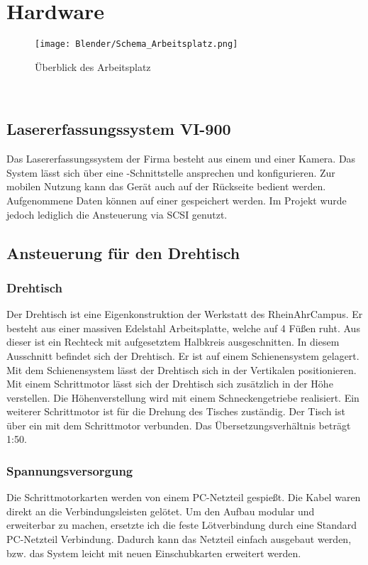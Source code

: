 \chapter{Hardware}
\label{sec:Hardware}
\begin{figure}[htb]
\centering
\texttt{[image: Blender/Schema\_Arbeitsplatz.png]}
\caption{Überblick des Arbeitsplatz}
\label{fig:Übersicht}
\end{figure}

\\

\section{Lasererfassungssystem VI-900}
Das Lasererfassungssystem  der Firma  besteht aus einem  und einer Kamera. Das System lässt sich über eine -Schnittstelle ansprechen und konfigurieren. Zur mobilen Nutzung kann das Gerät auch auf der Rückseite bedient werden. Aufgenommene Daten können auf einer  gespeichert werden. Im Projekt wurde jedoch lediglich die Ansteuerung via SCSI genutzt.

\section{Ansteuerung für den Drehtisch}
\subsection{Drehtisch}
Der Drehtisch ist eine Eigenkonstruktion der Werkstatt des RheinAhrCampus. Er besteht aus einer massiven Edelstahl Arbeitsplatte, welche auf 4 Füßen ruht. Aus dieser ist ein Rechteck mit aufgesetztem Halbkreis ausgeschnitten. In diesem Ausschnitt befindet sich der Drehtisch. Er ist auf einem Schienensystem gelagert. Mit dem Schienensystem lässt der Drehtisch sich in der Vertikalen positionieren. Mit einem Schrittmotor lässt sich der Drehtisch sich zusätzlich in der Höhe verstellen. Die Höhenverstellung wird mit einem Schneckengetriebe realisiert. Ein weiterer Schrittmotor ist für die Drehung des Tisches zuständig. Der Tisch ist über ein  mit dem Schrittmotor verbunden. Das Übersetzungsverhältnis beträgt 1:50.   
\subsection{Spannungsversorgung}
Die Schrittmotorkarten werden von einem PC-Netzteil gespießt. Die Kabel waren direkt an die Verbindungsleisten gelötet. Um den Aufbau modular und erweiterbar zu machen, ersetzte ich die feste Lötverbindung durch eine Standard PC-Netzteil Verbindung. Dadurch kann das Netzteil einfach ausgebaut werden, bzw. das System leicht mit neuen Einschubkarten erweitert werden.

